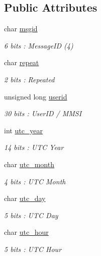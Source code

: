 \subsection*{Public Attributes}
\begin{DoxyCompactItemize}
\item 
char \mbox{\hyperlink{structaismsg__4_af8e6730f0974b45b58c501fd54a1daa8}{msgid}}
\begin{DoxyCompactList}\small\item\em 6 bits \+: Message\+ID (4) \end{DoxyCompactList}\item 
char \mbox{\hyperlink{structaismsg__4_ad8d75babe5b8c41cd4ca0ae60a68a3a5}{repeat}}
\begin{DoxyCompactList}\small\item\em 2 bits \+: Repeated \end{DoxyCompactList}\item 
unsigned long \mbox{\hyperlink{structaismsg__4_a812e70711a8391a706b822af75966de8}{userid}}
\begin{DoxyCompactList}\small\item\em 30 bits \+: User\+ID / M\+M\+SI \end{DoxyCompactList}\item 
int \mbox{\hyperlink{structaismsg__4_a9f133fbc7159b755b25a460d7ac4e122}{utc\+\_\+year}}
\begin{DoxyCompactList}\small\item\em 14 bits \+: U\+TC Year \end{DoxyCompactList}\item 
char \mbox{\hyperlink{structaismsg__4_adee1c79edb63717101e666877be68e02}{utc\+\_\+month}}
\begin{DoxyCompactList}\small\item\em 4 bits \+: U\+TC Month \end{DoxyCompactList}\item 
char \mbox{\hyperlink{structaismsg__4_a41b69242252398b210d57750348cd27e}{utc\+\_\+day}}
\begin{DoxyCompactList}\small\item\em 5 bits \+: U\+TC Day \end{DoxyCompactList}\item 
char \mbox{\hyperlink{structaismsg__4_a0262c91b6e2f7948583fc30a83b75b5f}{utc\+\_\+hour}}
\begin{DoxyCompactList}\small\item\em 5 bits \+: U\+TC Hour \end{DoxyCompactList}\item 

\end{DoxyCompactItemize}
